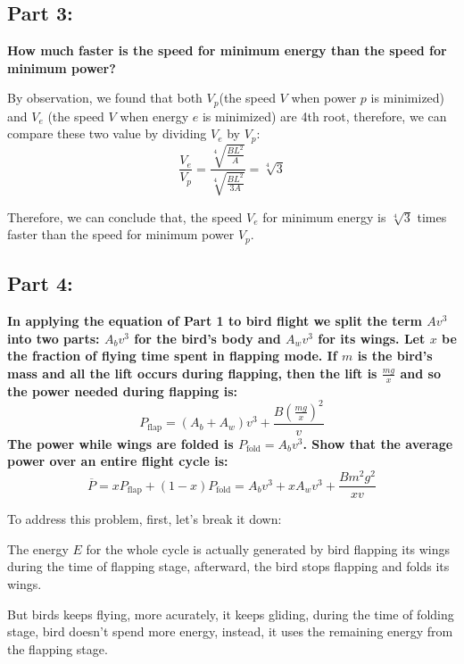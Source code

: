 \documentclass{article}
\begin{document}
\subsection*{Part 3:}
{\large \bfseries How much faster is the speed for minimum energy than the speed for minimum power?
}\setlength{\parskip}{1em}

By observation, we found that both \(V_p\)(the speed \(V\) when power \(p\) is minimized) and \(V_e\) (the speed \(V\) when energy \(e\) is minimized) are 4th root, therefore, we can compare these two value by dividing \(V_e\) by \(V_p\):
\[\frac{V_e}{V_p}=\frac{\sqrt[4]{\frac{BL^2}{A}}}{\sqrt[4]{\frac{BL^2}{3A}}} = \sqrt[4]{3}\]

Therefore, we can conclude that, the speed \(V_e\) for minimum energy is \(\sqrt[4]{3}\) times faster than the speed for minimum power \(V_p\).

\subsection*{Part 4:}
\label{sec:part4}
{\large \bfseries In applying the equation of Part 1 to bird flight we split the term \(Av^3\)into two
parts: \(A_bv^3\) for the bird’s body and \(A_wv^3\) for its wings. Let \(x\) be the fraction of flying time spent in flapping mode. If \(m\) is the bird’s mass and all the lift occurs during flapping, then the lift is \(\frac{mg}{x}\) and so the power needed during flapping is:
\[P_\text{flap} = (A_b+A_w)v^3+\frac{B(\frac{mg}{x})^2}{v}\]
The power while wings are folded is \(P_\text{fold}=A_bv^3\). Show that the average power over an entire flight cycle is:
\[\overline{P}=xP_\text{flap}+(1-x)P_\text{fold} = A_bv^3+xA_wv^3+\frac{Bm^2g^2}{xv}\]}

To address this problem, first, let's break it down:

 The energy \(E\) for the whole cycle is actually generated by bird flapping its wings during the time of flapping stage, afterward, the bird stops flapping and folds its wings.

 But birds keeps flying, more acurately, it keeps gliding, during the time of folding stage, bird doesn't spend more energy, instead, it uses the remaining energy from the flapping stage.
\end{document}
